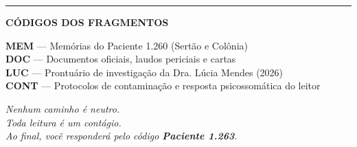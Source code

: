 \vspace{0.8em}

\noindent\rule{\textwidth}{0.5pt}
\vspace{0.6em}

\noindent\textbf{CÓDIGOS DOS FRAGMENTOS}

\vspace{0.3em}
\noindent\textcolor{mem}{\textbf{MEM}} --- Memórias do Paciente 1.260 (Sertão e Colônia)\\[0.25em]
\textcolor{doc}{\textbf{DOC}} --- Documentos oficiais, laudos periciais e cartas\\[0.25em]
\textcolor{luc}{\textbf{LUC}} --- Prontuário de investigação da Dra. Lúcia Mendes (2026)\\[0.25em]
\textcolor{cont}{\textbf{CONT}} --- Protocolos de contaminação e resposta psicossomática do leitor

\vspace{1.2em}
\begin{center}\itshape
Nenhum caminho é neutro.\\[0.2em]
Toda leitura é um contágio.\\[0.6em]
\upshape Ao final, você responderá pelo código \textbf{Paciente 1.263}.
\end{center}

\endgroup
\clearpage
